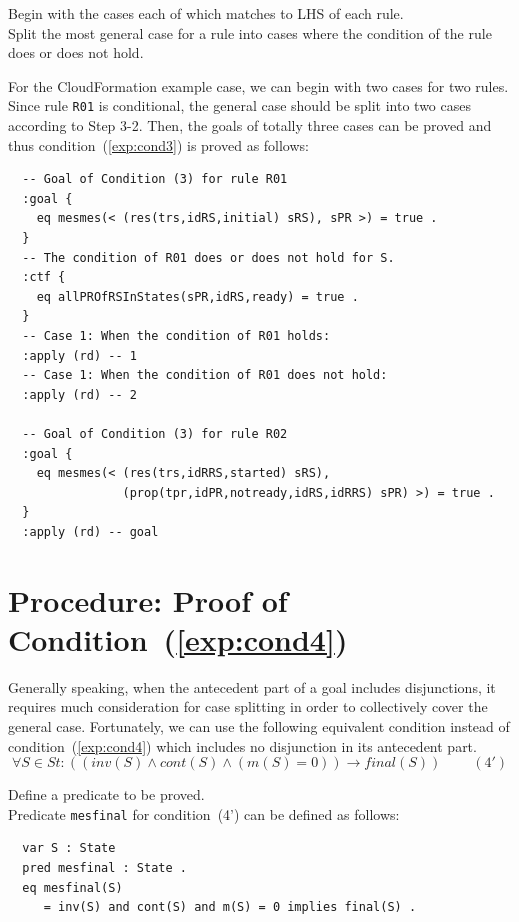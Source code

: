 \documentclass[12pt]{report}
\newcommand{\ra}{\rightarrow}
\begin{document}
\vspace{0.3cm}
 Begin with the cases each of which matches to
LHS of each rule. \\ 
 Split the most general case for a rule into
cases where the condition of the rule does or does not hold. 

For the CloudFormation example case, we can begin with two cases for
two rules. Since rule {\tt R01} is conditional, the general case
should be split into two cases according to Step 3-2. Then, the goals
of totally three cases can be proved and thus
condition~(\ref{exp:cond3}) is proved as follows:
\small
\begin{verbatim}
  -- Goal of Condition (3) for rule R01
  :goal {
    eq mesmes(< (res(trs,idRS,initial) sRS), sPR >) = true .
  }
  -- The condition of R01 does or does not hold for S.
  :ctf {
    eq allPROfRSInStates(sPR,idRS,ready) = true .
  }
  -- Case 1: When the condition of R01 holds:
  :apply (rd) -- 1
  -- Case 1: When the condition of R01 does not hold:
  :apply (rd) -- 2

  -- Goal of Condition (3) for rule R02
  :goal {
    eq mesmes(< (res(trs,idRRS,started) sRS),
                (prop(tpr,idPR,notready,idRS,idRRS) sPR) >) = true .
  }
  :apply (rd) -- goal

\end{verbatim}
\normalsize

\section{Procedure: Proof of Condition~(\ref{exp:cond4})}
\label{sec:mesfinal}
Generally speaking, when the antecedent part of a goal includes
disjunctions, it requires much consideration for case splitting in
order to collectively cover the general case. Fortunately, we can use
the following equivalent condition instead of
condition~(\ref{exp:cond4}) which includes no disjunction in its
antecedent part.
\[\forall S\in St:((inv(S)\land cont(S)\land(m(S) = 0))
  \ra final(S))~~~~~~~~~~(4')\]

\vspace{0.3cm}
 Define a predicate to be proved. \\ Predicate
         {\tt mesfinal} for condition~(4') can be defined as follows:
\small
\begin{verbatim}
  var S : State
  pred mesfinal : State .
  eq mesfinal(S)
     = inv(S) and cont(S) and m(S) = 0 implies final(S) .
\end{verbatim}
\normalsize
\end{document}
